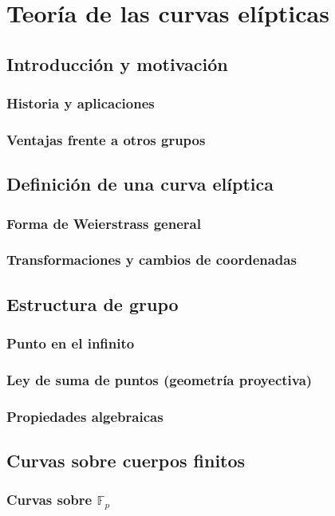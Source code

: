 \chapter{Teoría de las curvas elípticas}

\section{Introducción y motivación}
\subsection{Historia y aplicaciones}
\subsection{Ventajas frente a otros grupos}

\section{Definición de una curva elíptica}
\subsection{Forma de Weierstrass general}
\subsection{Transformaciones y cambios de coordenadas}

\section{Estructura de grupo}
\subsection{Punto en el infinito}
\subsection{Ley de suma de puntos (geometría proyectiva)}
\subsection{Propiedades algebraicas}

\section{Curvas sobre cuerpos finitos}
\subsection{Curvas sobre \texorpdfstring{$\mathbb{F}_p$}{Fp}}
